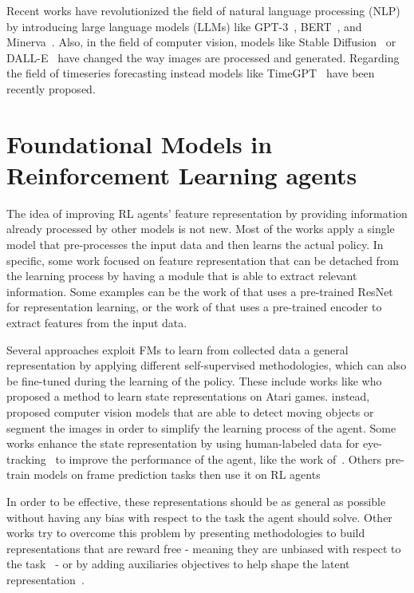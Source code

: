 Recent works have revolutionized the field of natural language processing (NLP) by introducing large language models (LLMs) like GPT-3~\citep{brown2020language}, BERT~\citep{devlin2018bert}, and Minerva~\citep{minerva}.
Also, in the field of computer vision, models like Stable Diffusion~\citep{rombach2022high} or DALL-E~\citep{ramesh2021zero} have changed the way images are processed and generated.
Regarding the field of timeseries forecasting instead models like TimeGPT~\citep{liao2024timegpt} have been recently proposed.



\section{Foundational Models in Reinforcement Learning agents}\label{sec:fm_rl}
The idea of improving RL agents' feature representation by providing information already processed by other models is not new.
Most of the works apply a single model that pre-processes the input data and then learns the actual policy.
In specific, some work focused on feature representation that can be detached from the learning process by having a module that is able to extract relevant information.
Some examples can be the work of \citet{shah2021rrl}that uses a pre-trained ResNet for representation learning, or the work of \citet{yuan2022pre}that uses a pre-trained encoder to extract features from the input data.

Several approaches exploit FMs to learn from collected data a general representation by applying different self-supervised methodologies, which can also be fine-tuned during the learning of the policy.
These include works like \citet{anand2019unsupervised}who proposed a method to learn state representations on Atari games.
\citet{kulkarni2019unsupervised, montalvo2023exploiting, goel2018unsupervised,xiao2022masked, wu2021self} instead, proposed computer vision models that are able to detect moving objects or segment the images in order to simplify the learning process of the agent.
Some works enhance the state representation by using human-labeled data for eye-tracking~\citep{zhang2020atari} to improve the performance of the agent, like the work of~\citet{thammineni2023selective}.
Others pre-train models on frame prediction tasks then use it on RL agents~\citep{finn2016unsupervised}


In order to be effective, these representations should be as general as possible without having any bias with respect to the task the agent should solve.
Other works try to overcome this problem by presenting methodologies to build representations that are reward free - meaning they are unbiased with respect to the task~\citep{stooke2021decoupling} - or by adding auxiliaries objectives to help shape the latent representation~\citep{lan2023bootstrapped}.

